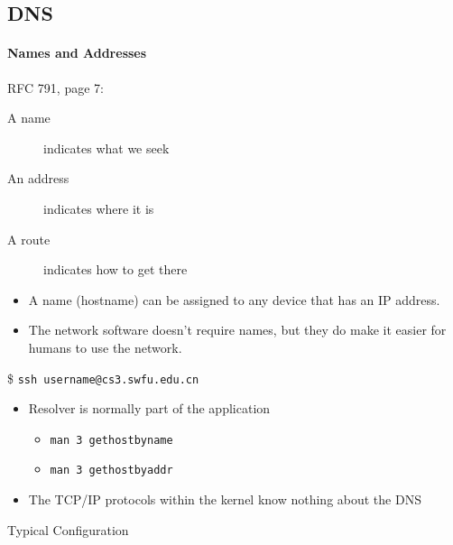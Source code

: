 \subsection{DNS}

\begin{frame}\framesubtitle{Names and Addresses}
  \begin{block}{RFC 791, page 7:}
    \begin{description}
    \item[A name] indicates what we seek
    \item[An address] indicates where it is
    \item[A route] indicates how to get there
    \end{description}
  \end{block}
  \begin{itemize}
  \item A name (hostname) can be assigned to any device that has an IP address.
  \item The network software doesn't require names, but they do make it easier for humans
    to use the network.
  \end{itemize}
\end{frame}

\begin{frame}
  \begin{block}{\$ \texttt{ssh username@cs3.swfu.edu.cn}}
    \begin{center}
    \end{center}
  \end{block}
  \begin{itemize}
  \item Resolver is normally part of the application
    \begin{itemize}
    \item \texttt{man 3 gethostbyname}
    \item \texttt{man 3 gethostbyaddr}
    \end{itemize}
  \item The TCP/IP protocols within the kernel know nothing about the DNS
  \end{itemize}
\end{frame}

\begin{frame}{Typical Configuration}
  \begin{center}
     
  \end{center}
\end{frame}

